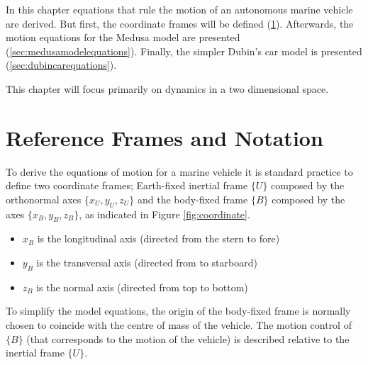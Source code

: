 \cleardoublepage
\label{chap:autonomousvehiclemodels}

\par In this chapter equations that rule the motion of an autonomous marine vehicle are derived. But first, the coordinate frames will be defined (\ref{sec:refframes}). Afterwards, the motion equations for the Medusa model are presented (\ref{sec:medusamodelequations}). Finally, the simpler Dubin's car model is presented (\ref{sec:dubincarequations}).
\par This chapter will focus primarily on dynamics in a two dimensional space.

\section{Reference Frames and Notation}
\label{sec:refframes}

\par To derive the equations of motion for a marine vehicle it is standard practice to define two coordinate frames; Earth-fixed inertial frame $\{U\}$ composed by the orthonormal axes $\{x_U,y_U,z_U\}$ and the body-fixed frame $\{B\}$ composed by the axes $\{x_B,y_B,z_B\}$, as indicated in Figure \ref{fig:coordinate}.

\begin{itemize}
    \item $x_B$ is the longitudinal axis (directed from the stern to fore)
    \item $y_B$ is the transversal axis (directed from to starboard)
    \item $z_B$ is the normal axis (directed from top to bottom)
\end{itemize}

\par To simplify the model equations, the origin of the body-fixed frame is normally chosen to coincide with the centre of mass of the vehicle. The motion control of $\{B\}$ (that corresponds to the motion of the vehicle) is described relative to the inertial frame $\{U\}$.

